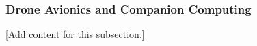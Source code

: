 
\subsubsection{Drone Avionics and Companion Computing}
\label{subsubsec:design_6_2_drone_avionics_companion}

[Add content for this subsection.]
